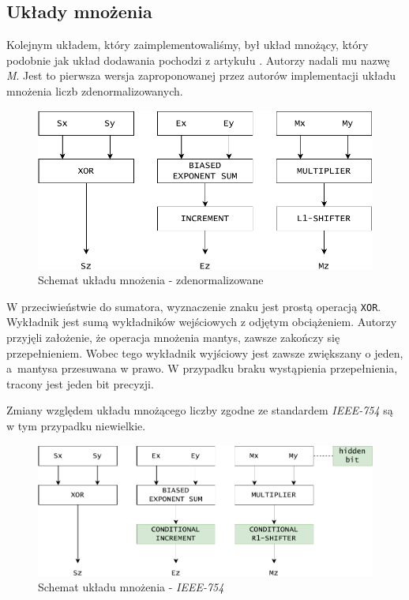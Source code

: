 \documentclass{article}
\begin{document}
\subsection{Układy mnożenia}

Kolejnym układem, który zaimplementowaliśmy, był układ mnożący, który podobnie jak układ dodawania pochodzi z artykułu \cite{art:old}.
Autorzy nadali mu nazwę \emph{M}.
Jest to pierwsza wersja zaproponowanej przez autorów implementacji układu mnożenia liczb zdenormalizowanych.

\begin{figure}[H]
	\centering
	\includegraphics[width=\textwidth]{figures/diagram_mul_denorm.pdf}
	\caption{Schemat układu mnożenia - zdenormalizowane}
	\label{fig:diagram_mul_denorm}
\end{figure}

W przeciwieństwie do sumatora, wyznaczenie znaku jest prostą operacją \texttt{XOR}.
Wykładnik jest sumą wykładników wejściowych z odjętym obciążeniem.
Autorzy przyjęli założenie, że operacja mnożenia mantys, zawsze zakończy się przepełnieniem.
Wobec tego wykładnik wyjściowy jest zawsze zwiększany o jeden, a~mantysa przesuwana w prawo.
W przypadku braku wystąpienia przepełnienia, tracony jest jeden bit precyzji.

Zmiany względem układu mnożącego liczby zgodne ze standardem \emph{IEEE-754} są w tym przypadku niewielkie.

\begin{figure}[H]
	\centering
	\includegraphics[width=\textwidth]{figures/diagram_mul_ieee754.pdf}
	\caption{Schemat układu mnożenia - \emph{IEEE-754}}
	\label{fig:diagram_mul_ieee754}
\end{figure}
\end{document}
